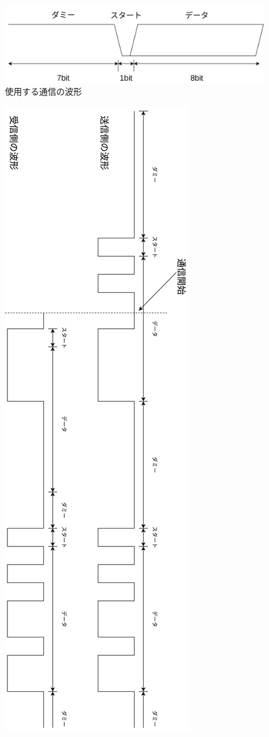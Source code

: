 \documentclass[a4paper,10pt]{article}
\begin{document}
\begin{multicols}{2}[\raggedcolumns]
\begin{figure}[H]
    \centering
    \includegraphics[width=0.9\linewidth]{figure/protocol.png} 
    \caption{使用する通信の波形} 
    \label{fig:protocol}
  \end{figure}

\begin{figure}[H]
    \centering
    \includegraphics[width=0.6\linewidth]{figure/saikai_protocol.png} 

\end{figure}
\end{multicols}
\end{document}
